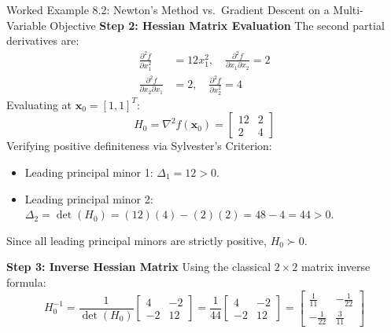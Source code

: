 \begin{examplebox}[breakable]{Worked Example 8.2: Newton's Method vs.\ Gradient Descent on a Multi-Variable Objective}
\textbf{Step 2: Hessian Matrix Evaluation}
The second partial derivatives are:
\begin{align}
\frac{\partial^2 f}{\partial x_1^2} &= 12x_1^2, \quad \frac{\partial^2 f}{\partial x_1 \partial x_2} = 2 \\
\frac{\partial^2 f}{\partial x_2 \partial x_1} &= 2, \quad \frac{\partial^2 f}{\partial x_2^2} = 4
\end{align}
Evaluating at $\mathbf{x}_0 = [1, 1]^T$:
\begin{equation}
H_0 = \nabla^2 f(\mathbf{x}_0) = \begin{bmatrix} 12 & 2 \\ 2 & 4 \end{bmatrix}
\end{equation}
Verifying positive definiteness via Sylvester's Criterion:
\begin{itemize}
    \item Leading principal minor 1: $\Delta_1 = 12 > 0$.
    \item Leading principal minor 2: $\Delta_2 = \det(H_0) = (12)(4) - (2)(2) = 48 - 4 = 44 > 0$.
\end{itemize}
Since all leading principal minors are strictly positive, $H_0 \succ 0$.

\textbf{Step 3: Inverse Hessian Matrix}
Using the classical $2 \times 2$ matrix inverse formula:
\begin{equation}
H_0^{-1} = \frac{1}{\det(H_0)} \begin{bmatrix} 4 & -2 \\ -2 & 12 \end{bmatrix} = \frac{1}{44} \begin{bmatrix} 4 & -2 \\ -2 & 12 \end{bmatrix} = \begin{bmatrix} \frac{1}{11} & -\frac{1}{22} \\ -\frac{1}{22} & \frac{3}{11} \end{bmatrix}
\end{equation}


\end{examplebox}

